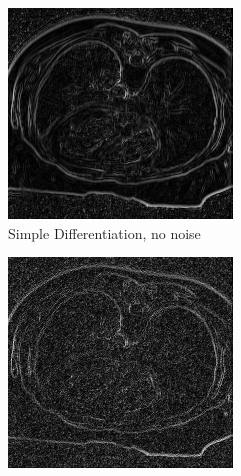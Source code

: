 \begin{figure}
  \centering
  
  \begin{subfigure}{.5\textwidth}
    \centering
    \includegraphics[width=.9\textwidth]{./edgedetection/images/sd_no_noise}
    \caption{Simple Differentiation, no noise}
    \label{fig:sd_no_noise}
  \end{subfigure}%
  \begin{subfigure}{.5\textwidth}
    \centering
    \includegraphics[width=.9\textwidth]{./edgedetection/images/sd_001_noise}

\end{subfigure}
\end{figure}

